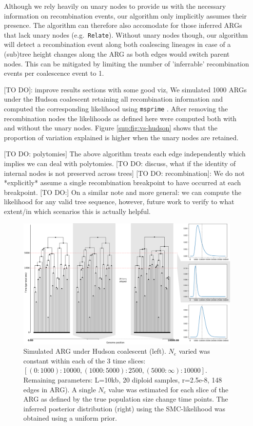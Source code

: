 \documentclass{article}
\newcommand{\relate}[0]{\texttt{Relate}}
\begin{document}
Although we rely heavily on unary nodes to provide us with the necessary 
information on recombination events, our algorithm only implicitly assumes their presence.
The algorithm can therefore also accomodate for 
those inferred ARGs that lack unary nodes (e.g.\ \relate). 
Without unary nodes though, our algorithm will detect a recombination event along 
both coalescing lineages in case of a (sub)tree height changes along the ARG as both 
edges would switch parent nodes. This can be mitigated by limiting the number of 
'inferrable' recombination events per coalescence event to 1.

[TO DO]: improve results sections with some good viz,
We simulated 1000 ARGs under the Hudson coalescent retaining all recombination information 
and computed the corresponding likelihood using \texttt{msprime} \citep{baumdicker_efficient_2021}. 
After removing the recombination nodes the likelihoods as defined here were computed both with and 
without the unary nodes. Figure \ref{sup:fig:vs-hudson} shows that the proportion of variation 
explained is higher when the unary nodes are retained.

[TO DO: polytomies] The above algorithm treats each edge independently which implies 
we can deal with polytomies.
[TO DO: discuss, what if the identity of internal nodes is not preserved across trees]
[TO DO: recombination]: We do not *explicitly* assume a single recombination breakpoint to have 
occurred at each breakpoint.
[TO DO:] On a similar note and more general: we can compute the likelihood for any 
valid tree sequence, however, future work to verify to what extent/in which scenarios 
this is actually helpful.

\begin{figure}[!ht]
\centering
\includegraphics[width=\textwidth]{figures/3-slices.png}
\caption{Simulated ARG under Hudson coalescent (left). $N_e$ varied was constant within each of the 3 time slices: $[(0:1000): 10 000, (1000:5000): 2500, (5000:\infty):10 000]$. Remaining parameters: L=10kb, 20 diploid samples, r=2.5e-8, 148 edges in ARG). A single $N_e$ value was estimated for each slice of the ARG as defined by the true population size change time points. The inferred posterior distribution (right) using the SMC-likelihood was obtained using a uniform prior.}
 \label{fig:3-arg-slices}
\end{figure}
 
\end{document}
